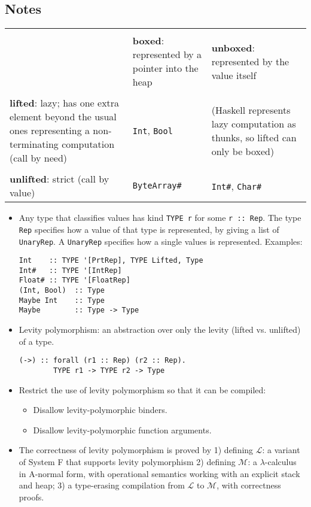 \subsection{Notes}

 \begin{tabular}{p{4cm}|p{4cm}|p{4cm}}
   \hline\\
   & \textbf{boxed}: represented by a pointer into the heap & \textbf{unboxed}: represented by the value itself \\
   \hline\\
   \textbf{lifted}: lazy; has one extra element beyond the usual ones representing a non-terminating computation (call by need) & \verb|Int|, \verb|Bool| & (Haskell represents lazy computation as thunks, so lifted can only be boxed) \\
   \hline\\
   \textbf{unlifted}: strict (call by value) & \verb|ByteArray#| & \verb|Int#|, \verb|Char#|\\
   \hline
 \end{tabular}
  
\begin{itemize}
\item Any type that classifies values has kind \verb|TYPE r| for some
  \verb|r :: Rep|. The type \verb|Rep| specifies how a value of that type is
  represented, by  giving a list of \verb|UnaryRep|. A \verb|UnaryRep| specifies
  how a single values is represented. Examples:
\begin{verbatim}
Int    :: TYPE '[PrtRep], TYPE Lifted, Type
Int#   :: TYPE '[IntRep]
Float# :: TYPE '[FloatRep]
(Int, Bool)  :: Type
Maybe Int    :: Type
Maybe        :: Type -> Type
\end{verbatim}
\item Levity polymorphism: an abstraction over only the levity (lifted vs.
  unlifted) of a type.
\begin{verbatim}
(->) :: forall (r1 :: Rep) (r2 :: Rep).
        TYPE r1 -> TYPE r2 -> Type
\end{verbatim}
\item Restrict the use of levity polymorphism so that it can be compiled:
  \begin{itemize}
  \item Disallow levity-polymorphic binders.
  \item Disallow levity-polymorphic function arguments.
  \end{itemize}
\item The correctness of levity polymorphism is proved by 1) defining $\mathcal{L}$:
  a variant of System F that supports levity polymorphism 2) defining
  $\mathcal{M}$: a $\lambda$-calculus in A-normal form, with operational
  semantics working with an explicit stack and heap; 3) a type-erasing
  compilation from $\mathcal{L}$ to $\mathcal{M}$, with correctness proofs.
\end{itemize}

